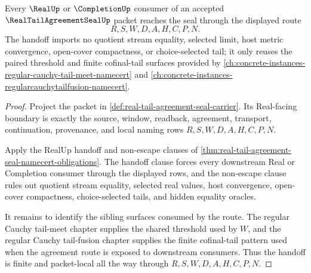 \begin{theorem}
\label{thm:real-tail-agreement-seal-real-completion-handoff}
Every $\RealUp$ or $\CompletionUp$ consumer of an accepted $\RealTailAgreementSealUp$ packet reaches the seal through the displayed route
$$
R,S,W,D,A,H,C,P,N.
$$
The handoff imports no quotient stream equality, selected limit, host metric convergence, open-cover compactness, or choice-selected tail; it only reuses the paired threshold and finite cofinal-tail surfaces provided by \autoref{ch:concrete-instances-regular-cauchy-tail-meet-namecert} and \autoref{ch:concrete-instances-regularcauchytailfusion-namecert}.
\end{theorem}
\begin{proof}
Project the packet in \autoref{def:real-tail-agreement-seal-carrier}. Its Real-facing boundary is exactly the source, window, readback, agreement, transport, continuation, provenance, and local naming rows $R,S,W,D,A,H,C,P,N$.

Apply the RealUp handoff and non-escape clauses of \autoref{thm:real-tail-agreement-seal-namecert-obligations}. The handoff clause forces every downstream Real or Completion consumer through the displayed rows, and the non-escape clause rules out quotient stream equality, selected real values, host convergence, open-cover compactness, choice-selected tails, and hidden equality oracles.

It remains to identify the sibling surfaces consumed by the route. The regular Cauchy tail-meet chapter supplies the shared threshold used by $W$, and the regular Cauchy tail-fusion chapter supplies the finite cofinal-tail pattern used when the agreement route is exposed to downstream consumers. Thus the handoff is finite and packet-local all the way through $R,S,W,D,A,H,C,P,N$.
\end{proof}

